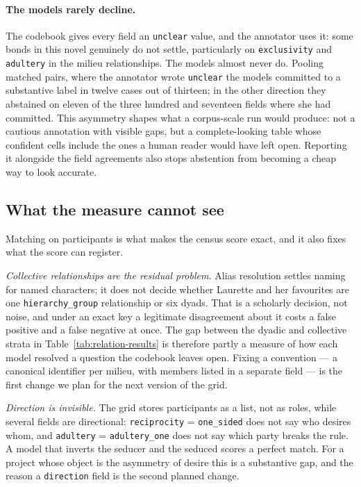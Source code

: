\paragraph{The models rarely decline.} The codebook gives every field an
\texttt{unclear} value, and the annotator uses it: some bonds in this novel genuinely
do not settle, particularly on \texttt{exclusivity} and \texttt{adultery} in the
milieu relationships. The models almost never do. Pooling matched pairs, where the
annotator wrote \texttt{unclear} the models committed to a substantive label in
twelve cases out of thirteen; in the other direction they abstained on eleven of the
three hundred and seventeen fields where she had committed. This asymmetry shapes
what a corpus-scale run would produce: not a cautious annotation with visible gaps,
but a complete-looking table whose confident cells include the ones a human reader
would have left open. Reporting it alongside the field agreements also stops
abstention from becoming a cheap way to look accurate.

\subsection{What the measure cannot see}

Matching on participants is what makes the census score exact, and it also fixes what
the score can register.

\emph{Collective relationships are the residual problem.} Alias resolution settles
naming for named characters; it does not decide whether Laurette and her favourites
are one \texttt{hierarchy\_group} relationship or six dyads. That is a scholarly
decision, not noise, and under an exact key a legitimate disagreement about it costs
a false positive and a false negative at once. The gap between the dyadic and
collective strata in Table~\ref{tab:relation-results} is therefore partly a measure
of how each model resolved a question the codebook leaves open. Fixing a convention
--- a canonical identifier per milieu, with members listed in a separate field --- is
the first change we plan for the next version of the grid.

\emph{Direction is invisible.} The grid stores participants as a list, not as roles,
while several fields are directional: \texttt{reciprocity} = \texttt{one\_sided} does
not say who desires whom, and \texttt{adultery} = \texttt{adultery\_one} does not say
which party breaks the rule. A model that inverts the seducer and the seduced scores
a perfect match. For a project whose object is the asymmetry of desire this is a
substantive gap, and the reason a \texttt{direction} field is the second planned
change.

